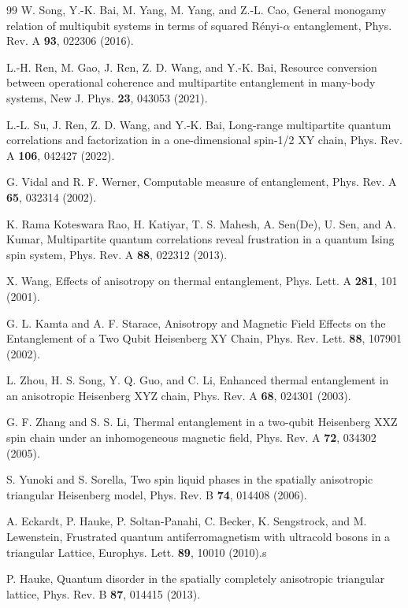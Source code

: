 \documentclass[pra,aps,twocolumn,showpacs]{revtex4}
\begin{document}
\begin{thebibliography}{99}
   W. Song, Y.-K. Bai, M. Yang, M. Yang, and Z.-L. Cao, General monogamy relation of multiqubit systems in terms of squared R\'{e}nyi-$\alpha$ entanglement, Phys. Rev. A \textbf{93}, 022306 (2016).

  L.-H. Ren, M. Gao, J. Ren, Z. D. Wang, and Y.-K. Bai, Resource conversion between operational coherence and multipartite entanglement in many-body systems, New J. Phys. \textbf{23}, 043053 (2021).

   L.-L. Su, J. Ren, Z. D. Wang, and Y.-K. Bai, Long-range multipartite quantum correlations and factorization in a one-dimensional spin-1/2 XY chain, Phys. Rev. A \textbf{106}, 042427 (2022).

   G. Vidal and R. F. Werner, Computable measure of entanglement, Phys. Rev. A \textbf{65}, 032314 (2002).
	
   K. Rama Koteswara Rao, H. Katiyar, T. S. Mahesh, A. Sen(De), U. Sen, and A. Kumar, Multipartite quantum correlations reveal frustration in a quantum Ising spin system, Phys. Rev. A \textbf{88}, 022312 (2013).	


    X. Wang, Effects of anisotropy on thermal entanglement, Phys. Lett. A \textbf{281}, 101 (2001).

   G. L. Kamta and A. F. Starace, Anisotropy and Magnetic Field Effects on the Entanglement of a Two Qubit Heisenberg XY Chain, Phys. Rev. Lett. \textbf{88}, 107901 (2002).

    L. Zhou, H. S. Song, Y. Q. Guo, and C. Li, Enhanced thermal entanglement in an anisotropic Heisenberg XYZ chain, Phys. Rev. A \textbf{68}, 024301 (2003).

   G. F. Zhang and S. S. Li, Thermal entanglement in a two-qubit Heisenberg XXZ spin chain under an inhomogeneous magnetic field, Phys. Rev. A \textbf{72}, 034302 (2005).


   S. Yunoki and S. Sorella, Two spin liquid phases in the spatially anisotropic triangular Heisenberg model, Phys. Rev. B \textbf{74}, 014408 (2006).

  A. Eckardt, P. Hauke, P. Soltan-Panahi, C. Becker, K. Sengstrock, and M. Lewenstein, Frustrated quantum antiferromagnetism with ultracold bosons in a triangular Lattice, Europhys. Lett. \textbf{89}, 10010 (2010).s

   P. Hauke, Quantum disorder in the spatially completely anisotropic triangular lattice, Phys. Rev. B \textbf{87}, 014415 (2013).


\end{thebibliography}
\end{document}
